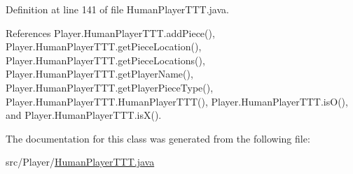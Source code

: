 Definition at line 141 of file Human\+Player\+T\+T\+T.\+java.



References Player.\+Human\+Player\+T\+T\+T.\+add\+Piece(), Player.\+Human\+Player\+T\+T\+T.\+get\+Piece\+Location(), Player.\+Human\+Player\+T\+T\+T.\+get\+Piece\+Locations(), Player.\+Human\+Player\+T\+T\+T.\+get\+Player\+Name(), Player.\+Human\+Player\+T\+T\+T.\+get\+Player\+Piece\+Type(), Player.\+Human\+Player\+T\+T\+T.\+Human\+Player\+T\+T\+T(), Player.\+Human\+Player\+T\+T\+T.\+is\+O(), and Player.\+Human\+Player\+T\+T\+T.\+is\+X().



The documentation for this class was generated from the following file\+:\begin{DoxyCompactItemize}
\item 
src/\+Player/\hyperlink{_human_player_t_t_t_8java}{Human\+Player\+T\+T\+T.\+java}\end{DoxyCompactItemize}
